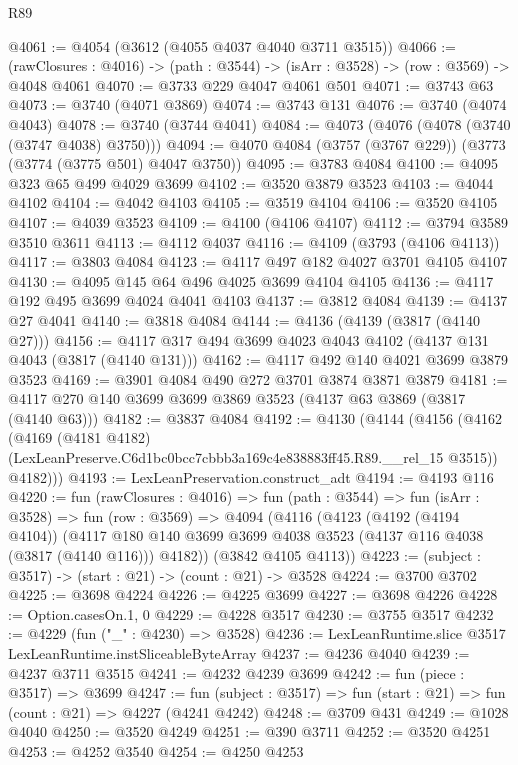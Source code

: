 \begin{lexlean}{R89}
\begin{coremodule}
@4061 := @4054 (@3612 (@4055 @4037 @4040 @3711 @3515))
@4066 := (rawClosures : @4016) -> (path : @3544) -> (isArr : @3528) -> (row : @3569) -> @4048 @4061
@4070 := @3733 @229 @4047 @4061 @501
@4071 := @3743 @63
@4073 := @3740 (@4071 @3869)
@4074 := @3743 @131
@4076 := @3740 (@4074 @4043)
@4078 := @3740 (@3744 @4041)
@4084 := @4073 (@4076 (@4078 (@3740 (@3747 @4038) @3750)))
@4094 := @4070 @4084 (@3757 (@3767 @229)) (@3773 (@3774 (@3775 @501) @4047 @3750))
@4095 := @3783 @4084
@4100 := @4095 @323 @65 @499 @4029 @3699
@4102 := @3520 @3879 @3523
@4103 := @4044 @4102
@4104 := @4042 @4103
@4105 := @3519 @4104
@4106 := @3520 @4105
@4107 := @4039 @3523
@4109 := @4100 (@4106 @4107)
@4112 := @3794 @3589 @3510 @3611
@4113 := @4112 @4037
@4116 := @4109 (@3793 (@4106 @4113))
@4117 := @3803 @4084
@4123 := @4117 @497 @182 @4027 @3701 @4105 @4107
@4130 := @4095 @145 @64 @496 @4025 @3699 @4104 @4105
@4136 := @4117 @192 @495 @3699 @4024 @4041 @4103
@4137 := @3812 @4084
@4139 := @4137 @27 @4041
@4140 := @3818 @4084
@4144 := @4136 (@4139 (@3817 (@4140 @27)))
@4156 := @4117 @317 @494 @3699 @4023 @4043 @4102 (@4137 @131 @4043 (@3817 (@4140 @131)))
@4162 := @4117 @492 @140 @4021 @3699 @3879 @3523
@4169 := @3901 @4084 @490 @272 @3701 @3874 @3871 @3879
@4181 := @4117 @270 @140 @3699 @3699 @3869 @3523 (@4137 @63 @3869 (@3817 (@4140 @63)))
@4182 := @3837 @4084
@4192 := @4130
    (@4144
      (@4156
        (@4162
          (@4169
            (@4181 @4182)
            (LexLeanPreserve.C6d1bc0bcc7cbbb3a169c4e838883ff45.R89.__rel_15 @3515))
          @4182)))
@4193 := LexLeanPreservation.construct_adt
@4194 := @4193 @116
@4220 := fun (rawClosures : @4016) =>
  fun (path : @3544) =>
  fun (isArr : @3528) =>
  fun (row : @3569) =>
  @4094
    (@4116
      (@4123
        (@4192 (@4194 @4104))
        (@4117 @180 @140 @3699 @3699 @4038 @3523 (@4137 @116 @4038 (@3817 (@4140 @116))) @4182))
      (@3842 @4105 @4113))
@4223 := (subject : @3517) -> (start : @21) -> (count : @21) -> @3528
@4224 := @3700 @3702
@4225 := @3698 @4224
@4226 := @4225 @3699
@4227 := @3698 @4226
@4228 := Option.casesOn.{1, 0}
@4229 := @4228 @3517
@4230 := @3755 @3517
@4232 := @4229 (fun ("_" : @4230) => @3528)
@4236 := LexLeanRuntime.slice @3517 LexLeanRuntime.instSliceableByteArray
@4237 := @4236 @4040
@4239 := @4237 @3711 @3515
@4241 := @4232 @4239 @3699
@4242 := fun (piece : @3517) => @3699
@4247 := fun (subject : @3517) => fun (start : @21) => fun (count : @21) => @4227 (@4241 @4242)
@4248 := @3709 @431
@4249 := @1028 @4040
@4250 := @3520 @4249
@4251 := @390 @3711
@4252 := @3520 @4251
@4253 := @4252 @3540
@4254 := @4250 @4253

\end{coremodule}
\end{lexlean}
